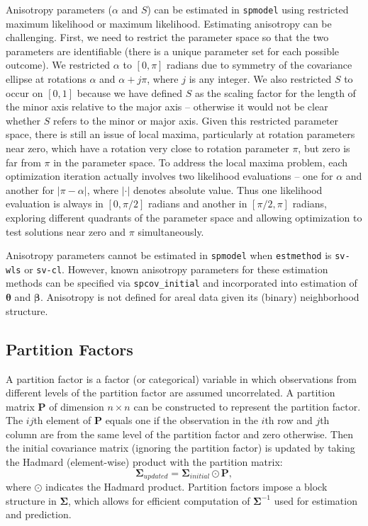 \documentclass{article}
\begin{document}
Anisotropy parameters (\(\alpha\) and \(S\)) can be estimated in
\texttt{spmodel} using restricted maximum likelihood or maximum
likelihood. Estimating anisotropy can be challenging. First, we need to
restrict the parameter space so that the two parameters are identifiable
(there is a unique parameter set for each possible outcome). We
restricted \(\alpha\) to \([0, \pi]\) radians due to symmetry of the
covariance ellipse at rotations \(\alpha\) and \(\alpha + j \pi\), where
\(j\) is any integer. We also restricted \(S\) to occur on \([0, 1]\)
because we have defined \(S\) as the scaling factor for the length of
the minor axis relative to the major axis -- otherwise it would not be
clear whether \(S\) refers to the minor or major axis. Given this
restricted parameter space, there is still an issue of local maxima,
particularly at rotation parameters near zero, which have a rotation
very close to rotation parameter \(\pi\), but zero is far from \(\pi\)
in the parameter space. To address the local maxima problem, each
optimization iteration actually involves two likelihood evaluations --
one for \(\alpha\) and another for \(|\pi - \alpha|\), where \(|\cdot|\)
denotes absolute value. Thus one likelihood evaluation is always in
\([0, \pi/2]\) radians and another in \([\pi/2, \pi]\) radians,
exploring different quadrants of the parameter space and allowing
optimization to test solutions near zero and \(\pi\) simultaneously.

Anisotropy parameters cannot be estimated in \texttt{spmodel} when
\texttt{estmethod} is \texttt{sv-wls} or \texttt{sv-cl}. However, known
anisotropy parameters for these estimation methods can be specified via
\texttt{spcov\_initial} and incorporated into estimation of
\(\boldsymbol{\theta}\) and \(\boldsymbol{\beta}\). Anisotropy is not
defined for areal data given its (binary) neighborhood structure.

\hypertarget{partition-factors}{%
\subsection{Partition Factors}\label{partition-factors}}

A partition factor is a factor (or categorical) variable in which
observations from different levels of the partition factor are assumed
uncorrelated. A partition matrix \(\mathbf{P}\) of dimension
\(n \times n\) can be constructed to represent the partition factor. The
\(ij\)th element of \(\mathbf{P}\) equals one if the observation in the
\(i\)th row and \(j\)th column are from the same level of the partition
factor and zero otherwise. Then the initial covariance matrix (ignoring
the partition factor) is updated by taking the Hadmard (element-wise)
product with the partition matrix: \begin{equation*}
 \boldsymbol{\Sigma}_{updated} = \boldsymbol{\Sigma}_{initial} \odot \mathbf{P},
\end{equation*} where \(\odot\) indicates the Hadmard product. Partition
factors impose a block structure in \(\boldsymbol{\Sigma}\), which
allows for efficient computation of \(\boldsymbol{\Sigma}^{-1}\) used
for estimation and prediction.
\end{document}
